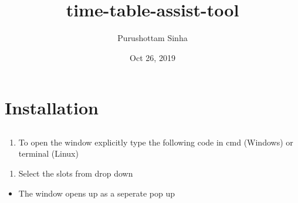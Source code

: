 \documentclass[letterpaper,10pt,english]{sphinxmanual}
\title{time-table-assist-tool}
\date{Oct 26, 2019}
\author{Purushottam Sinha}
\begin{document}
\pagestyle{empty}
\sphinxmaketitle
\pagestyle{plain}
\sphinxtableofcontents
\pagestyle{normal}
\label{\detokenize{index::doc}}



\chapter{Installation}
\label{\detokenize{index:installation}}
\begin{sphinxVerbatim}[commandchars=\\\{\}]
   
 
\end{sphinxVerbatim}


\section{}
\label{\detokenize{user_manual:user-manual}}\label{\detokenize{user_manual::doc}}

\subsection{}
\label{\detokenize{user_manual:working-in-gui-1}}

\subsubsection{}
\label{\detokenize{user_manual:steps}}
\begin{enumerate}
%
\item {} 
To open the window explicitly type the following code in cmd (Windows) or terminal (Linux)

\end{enumerate}

\begin{sphinxVerbatim}[commandchars=\\\{\}]
 
\end{sphinxVerbatim}
\begin{enumerate}
%
\setcounter{enumi}{1}
\item {} 
Select the slots from drop down

\end{enumerate}
\begin{itemize}
\item {} 
The window opens up as a seperate pop up

\end{itemize}
\end{document}
